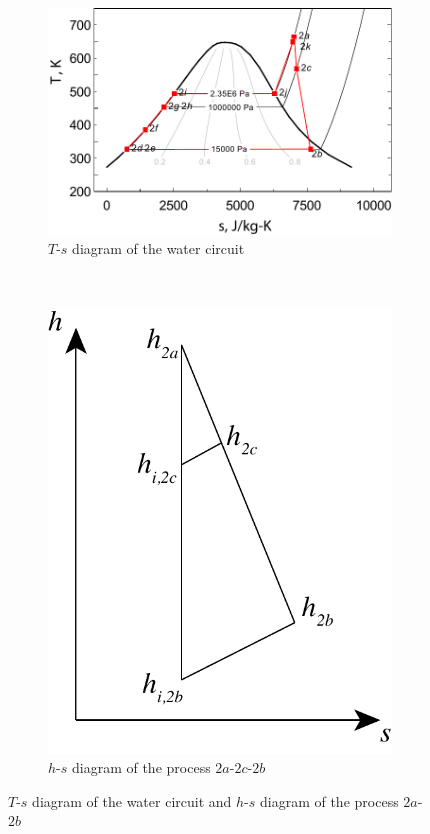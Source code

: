 \noindent \begin{figure}[htbp]
\centering
	\begin{subfigure}[b]{0.6\columnwidth}
	\includegraphics[width = \columnwidth]{fig/T-s_Water.pdf}
	\caption{$T$-$s$ diagram of the water circuit}\label{fig:Ts_Water}
	\end{subfigure}
	~
\begin{subfigure}[b]{0.3\columnwidth}
	\includegraphics[width = \columnwidth]{fig/SteamTurbine_hs.pdf}
	\caption{$h$-$s$ diagram of the process $2a$-$2c$-$2b$}\label{fig:SteamTurbine_hs}
	\end{subfigure}
	
	\caption{$T$-$s$ diagram of the water circuit and $h$-$s$ diagram of the process $2a$-$2b$}\label{fig:SteamTurbine_hs_p}
\end{figure}
   
